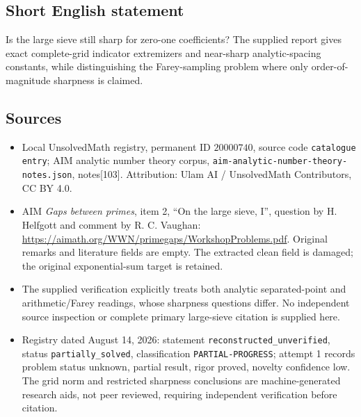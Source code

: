 \documentclass[11pt]{article}
\begin{document}
\subsection{Short English statement}
Is the large sieve still sharp for zero-one coefficients? The supplied report gives exact complete-grid indicator extremizers and near-sharp analytic-spacing constants, while distinguishing the Farey-sampling problem where only order-of-magnitude sharpness is claimed.
\subsection{Sources}
\begin{itemize}
\item Local UnsolvedMath registry, permanent ID \(20000740\), source code \texttt{catalogue entry}; AIM analytic number theory corpus, \texttt{aim-analytic-number-theory-notes.json}, notes[103]. Attribution: Ulam AI / UnsolvedMath Contributors, CC BY 4.0.
\item AIM \emph{Gaps between primes}, item 2, ``On the large sieve, I'', question by H. Helfgott and comment by R. C. Vaughan: \url{https://aimath.org/WWN/primegaps/WorkshopProblems.pdf}. Original remarks and literature fields are empty. The extracted clean field is damaged; the original exponential-sum target is retained.
\item The supplied verification explicitly treats both analytic separated-point and arithmetic/Farey readings, whose sharpness questions differ. No independent source inspection or complete primary large-sieve citation is supplied here.
\item Registry dated August 14, 2026: statement \texttt{reconstructed\_unverified}, status \texttt{partially\_solved}, classification \texttt{PARTIAL-PROGRESS}; attempt 1 records problem status unknown, partial result, rigor proved, novelty confidence low. The grid norm and restricted sharpness conclusions are machine-generated research aids, not peer reviewed, requiring independent verification before citation.
\end{itemize}
\end{document}
